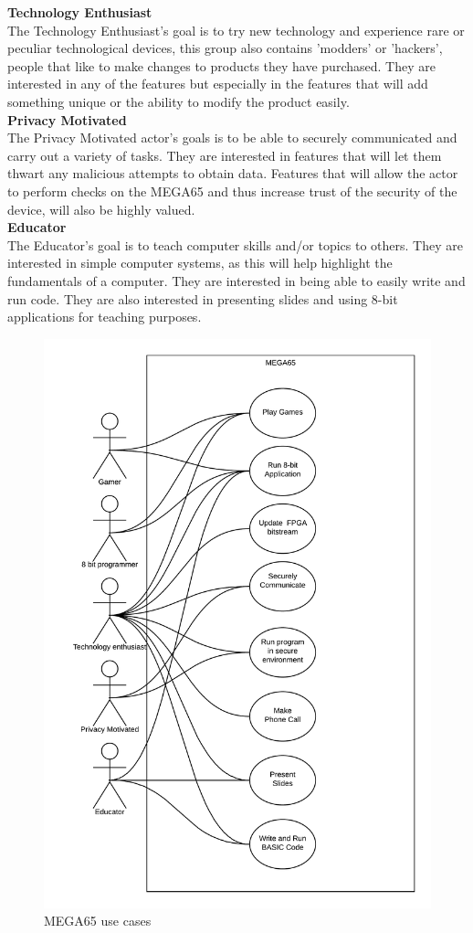 \textbf{Technology Enthusiast}\\
The Technology Enthusiast's goal is to try new technology and experience rare or peculiar technological devices, this group also contains 'modders' or 'hackers', people that like to make changes to products they have purchased. They are interested in any of the features but especially in the features that will add something unique or the ability to modify the product easily.\\

\textbf{Privacy Motivated}\\
The Privacy Motivated actor's goals is to be able to securely communicated and carry out a variety of tasks. They are interested in features that will let them thwart any malicious attempts to obtain data. Features that will allow the actor to perform checks on the MEGA65 and thus increase trust of the security of the device, will also be highly valued. \\

\textbf{Educator}\\
The Educator's goal is to teach computer skills and/or topics to others. They are interested in simple computer systems, as this will help highlight the fundamentals of a computer. They are interested in being able to easily write and run code. They are also interested in presenting slides and using 8-bit applications for teaching purposes.\\

\begin{figure} \begin{center}
\includegraphics[width=.6\linewidth]{pics/MEGA65_use_case} 
\end{center} 
\caption{MEGA65 use cases\\}
\label{MEGA65_use_cases}
\end{figure}

